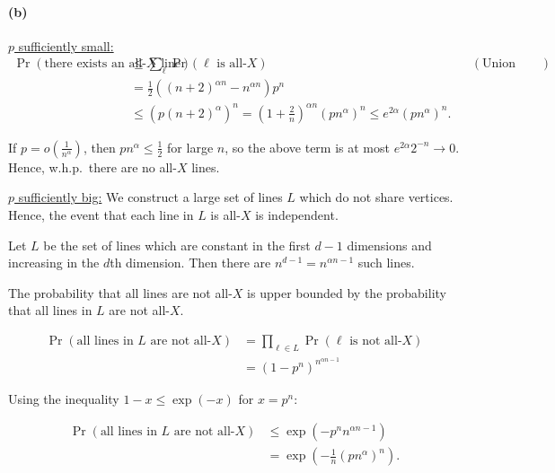 \documentclass[11pt,letterpaper]{article}
\theoremstyle{definition}
\begin{document}

\paragraph{(b)}

\ul{$p$ sufficiently small:}
\begin{align*}
    \Pr(\text{there exists an all-}X \text{ line}) &\leq \sum_{\ell} \Pr(\ell \text{ is all-}X)&& (\text{Union Bound}) \\
    & = \frac{1}{2}((n+2)^{\alpha n}-n^{\alpha n}) p^{ n} \\
    & \leq (p(n+2)^{\alpha})^n = \left(1+\frac{2}{n}\right)^{\alpha n}(pn^\alpha)^n \leq e^{2\alpha}(pn^\alpha)^n.
\end{align*}

If $p = o\left(\frac{1}{n^\alpha}\right)$, then $pn^\alpha\leq\frac12$ for large $n$, so the above term is at most $e^{2\alpha}2^{-n}\to 0$.
Hence, w.h.p.\ there are no all-$X$ lines.

\ul{$p$ sufficiently big:}
We construct a large set of lines $L$ which do not share vertices. 
Hence, the event that each line in $L$ is all-$X$ is independent.

Let $L$ be the set of lines which are constant in the first $d-1$ dimensions and increasing in the $d$th dimension. 
Then there are $n^{d-1} = n^{\alpha n-1}$ such lines.

The probability that all lines are not all-$X$ is upper bounded by the probability that all lines in $L$ are not all-$X$.

\begin{align*}
    \Pr(\text{all lines in }L\text{ are not all-}X) &= \prod_{\ell\in L}\Pr (\ell\text{ is not all-}X) \\
    & =(1-p^n)^{n^{\alpha n - 1}}
\end{align*}

Using the inequality $1-x \leq \exp(-x)$ for $x=p^n$:

\begin{align*}
    \Pr(\text{all lines in }L\text{ are not all-}X) &\leq \exp\left(-p^n{n^{\alpha n - 1}}\right) \\
    & = \exp\left(-\frac{1}{n}(pn^\alpha)^n\right).
\end{align*}
\end{document}

